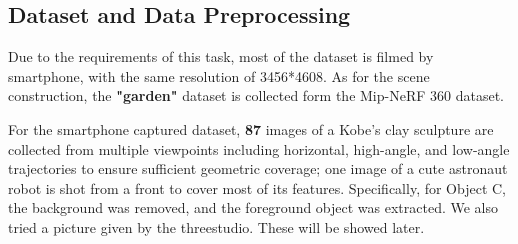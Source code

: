\subsection{Dataset and Data Preprocessing}
Due to the requirements of this task, most of the dataset is filmed by smartphone, with the same resolution of 3456*4608. As for the scene construction, the \textbf{"garden"} dataset is collected form the Mip-NeRF 360 dataset.

For the smartphone captured dataset, \textbf{87} images of a Kobe's clay sculpture are collected from multiple viewpoints including horizontal, high-angle, and low-angle trajectories to ensure sufficient geometric coverage; one image of a cute astronaut robot is shot from a front to cover most of its features. Specifically, for Object C, the background was removed, and the foreground object was extracted. We also tried a picture given by the threestudio. These will be showed later.  